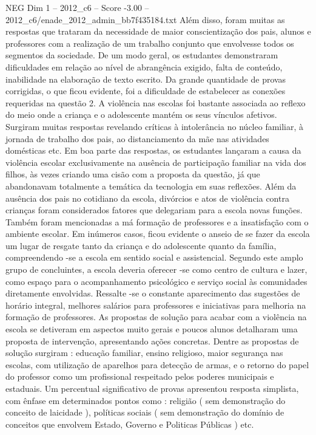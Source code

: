 \begin{textsample}{NEG Dim 1 – 2012\_c6 – Score -3.00 – 2012\_c6/enade\_2012\_admin\_bb7f435184.txt}
Além disso, foram muitas as respostas que trataram da necessidade de maior conscientização dos pais, alunos e professores com a realização de um trabalho conjunto que envolvesse todos os segmentos da sociedade.
De um modo geral, os estudantes demonstraram dificuldades em relação ao nível de abrangência exigido, falta de conteúdo, inabilidade na elaboração de texto escrito.
Da grande quantidade de provas corrigidas, o que ficou evidente, foi a dificuldade de estabelecer as conexões requeridas na questão 2.
A violência nas escolas foi bastante associada ao reflexo do meio onde a criança e o adolescente mantém os seus vínculos afetivos.
Surgiram muitas respostas revelando críticas à intolerância no núcleo familiar, à jornada de trabalho dos pais, ao distanciamento da mãe nas atividades domésticas etc.
Em boa parte das respostas, os estudantes lançaram a causa da violência escolar exclusivamente na ausência de participação familiar na vida dos filhos, às vezes criando uma cisão com a proposta da questão, já que abandonavam totalmente a temática da tecnologia em suas reflexões.
Além da ausência dos pais no cotidiano da escola, divórcios e atos de violência contra crianças foram considerados fatores que delegariam para a escola novas funções.
Também foram mencionadas a má formação de professores e a insatisfação com o ambiente escolar.
Em inúmeros casos, ficou evidente o anseio de se fazer da escola um lugar de resgate tanto da criança e do adolescente quanto da família, compreendendo -se a escola em sentido social e assistencial.
Segundo este amplo grupo de concluintes, a escola deveria oferecer -se como centro de cultura e lazer, como espaço para o acompanhamento psicológico e serviço social às comunidades diretamente envolvidas.
Ressalte -se o constante aparecimento das sugestões de horário integral, melhores salários para professores e iniciativas para melhoria na formação de professores.
As propostas de solução para acabar com a violência na escola se detiveram em aspectos muito gerais e poucos alunos detalharam uma proposta de intervenção, apresentando ações concretas.
Dentre as propostas de solução surgiram : educação familiar, ensino religioso, maior segurança nas escolas, com utilização de aparelhos para detecção de armas, e o retorno do papel do professor como um profissional respeitado pelos poderes municipais e estaduais.
Um percentual significativo de provas apresentou resposta simplista, com ênfase em determinados pontos como : religião ( sem demonstração do conceito de laicidade ), políticas sociais ( sem demonstração do domínio de conceitos que envolvem Estado, Governo e Politicas Públicas ) etc.

\end{textsample}
